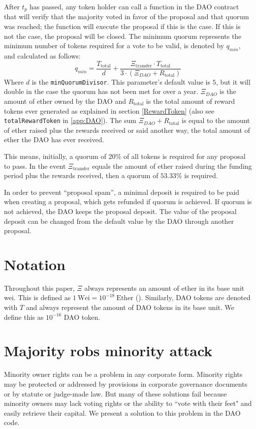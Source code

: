\documentclass[9pt,oneside]{amsart}
\begin{document}
\begin{multicols}{2}
After $t_p$ has passed, any token holder can call a function in the DAO contract that will verify that the majority voted in favor of the proposal and that quorum was reached; the function will execute the proposal if this is the case. If this is not the case, the proposal will be closed. The minimum quorum represents the minimum number of tokens required for a vote to be valid, is denoted by $q_{min}$, and calculated as follows:
\begin{equation}
 q_{min} = \frac{T_{\text{total}}}{d} + \frac{\Xi_{\text{transfer}} \cdot T_{\text{total}}}{3 \cdot (\Xi_{DAO} + R_{\text{total}})}
 \label{minQuorum}
\end{equation}
Where $d$ is the \verb|minQuorumDivisor|. This parameter's default value is $5$, but it will double in the case the quorum has not been met for over a year.
$\Xi_{DAO}$ is the amount of ether owned by the DAO and $R_{\text{total}}$ is the total amount of reward tokens ever generated as explained in section \ref{RewardToken} (also see \verb|totalRewardToken| in \ref{app:DAO}). The sum $\Xi_{DAO} + R_{\text{total}}$ is equal to the amount of ether raised plus the rewards received or said another way, the total amount of ether the DAO has ever received.

This means, initially, a quorum of  $20\%$ of all tokens is required for any proposal to pass. In the event $\Xi_{\text{transfer}}$ equals the amount of ether raised during the funding period plus the rewards received, then a quorum of $53.33\%$ is required.

In order to prevent ``proposal spam'', a minimal deposit is required to be paid when creating a proposal, which gets refunded if quorum is achieved. If quorum is not achieved, the DAO keeps the proposal deposit. The value of the proposal deposit can be changed from the default value by the DAO through another proposal.

\section{Notation}
Throughout this paper, $\Xi$ always represents an amount of ether in its base unit wei. This is defined as $1 \: \text{Wei} = 10^{-18} \: \text{Ether}$ (\cite{Wood2014ethereum}).
Similarly, DAO tokens are denoted with $T$ and always represent the amount of DAO tokens in its base unit. We define this as $10^{-16}$ DAO token.
\section{Majority robs minority attack}
Minority owner rights can be a problem in any corporate form.  Minority rights may be protected or addressed by provisions in corporate governance documents or by statute or judge-made law.  But many of these solutions fail because minority owners may lack voting rights or the ability to ``vote with their feet" and easily retrieve their capital.  We present a solution to this problem in the DAO code.  


\end{multicols}
\end{document}
